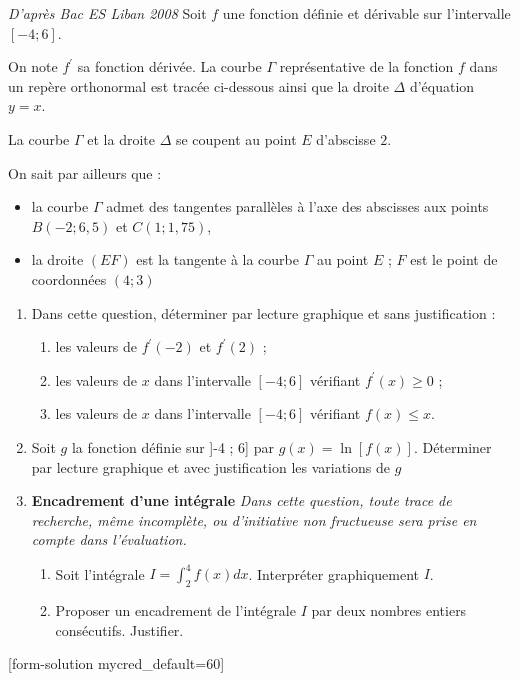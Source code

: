 
%
\textit{D'après Bac ES Liban 2008}
Soit $f$ une fonction définie et dérivable sur l'intervalle $\left[-4 ; 6\right]$.
\par
On note $f^{\prime}$ sa fonction dérivée. La courbe $\Gamma $ représentative de la fonction $f$ dans un repère orthonormal est tracée ci-dessous ainsi que la droite $\Delta $ d'équation $y=x$.
\par
La courbe $\Gamma $ et la droite $\Delta $ se coupent au point $E$ d'abscisse $2$.
\par
On sait par ailleurs que :
\begin{itemize}
     \item
     la courbe $\Gamma $ admet des tangentes parallèles à l'axe des abscisses aux points $B \left(-2 ; 6,5\right)$ et $C\left(1 ; 1,75\right)$,
     \item
     la droite $\left(EF\right)$ est la tangente à la courbe $\Gamma $ au point $E$ ; $F$ est le point de coordonnées $\left(4 ; 3\right)$
\end{itemize}

\begin{center}
\end{center}

\begin{enumerate}
     \item
     Dans cette question, déterminer par lecture graphique et sans justification :
     \begin{enumerate}[label=\alph*.]
          \item
          les valeurs de $f^{\prime}\left(-2\right)$ et $f^{\prime}\left(2\right)$ ;
          \item
          les valeurs de $x$ dans l'intervalle $\left[-4 ; 6\right]$ vérifiant $f^{\prime}\left(x\right)\geqslant 0$ ;
          \item
          les valeurs de $x$ dans l'intervalle $\left[-4 ; 6\right]$ vérifiant $f\left(x\right) \leqslant x$.
     \end{enumerate}
     \item
     Soit $g$ la fonction définie sur ]-4 ; 6] par $g\left(x\right)=\ln\left[f\left(x\right)\right]$. Déterminer par lecture graphique et avec justification les variations de $g$
     \item
     \textbf{Encadrement d'une intégrale}
\p
     \textit{Dans cette question, toute trace de recherche, même incomplète, ou d'initiative non fructueuse sera prise en compte dans l'évaluation.}
     \begin{enumerate}[label=\alph*.]
          \item
          Soit l'intégrale $I=\int_{ 2}^{ 4} f\left(x\right) dx$. Interpréter graphiquement $I$.
          \item
          Proposer un encadrement de l'intégrale $I$ par deux nombres entiers consécutifs. Justifier.
     \end{enumerate}
\end{enumerate}
[form-solution mycred_default=60]
